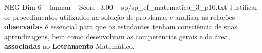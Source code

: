 \begin{textsample}{NEG Dim 6 – human – Score -3.00 – sp/sp\_ef\_matematica\_3\_p10.txt}  \label{ex:f6_neg_002}
Justificar os procedimentos utilizados na solução de problemas e analisar as relações \textbf{observadas} é essencial para que os estudantes tenham consciência de suas aprendizagens, bem como desenvolvam as competências gerais e da área, \textbf{associadas} ao \textbf{Letramento} Matemático.

\end{textsample}
